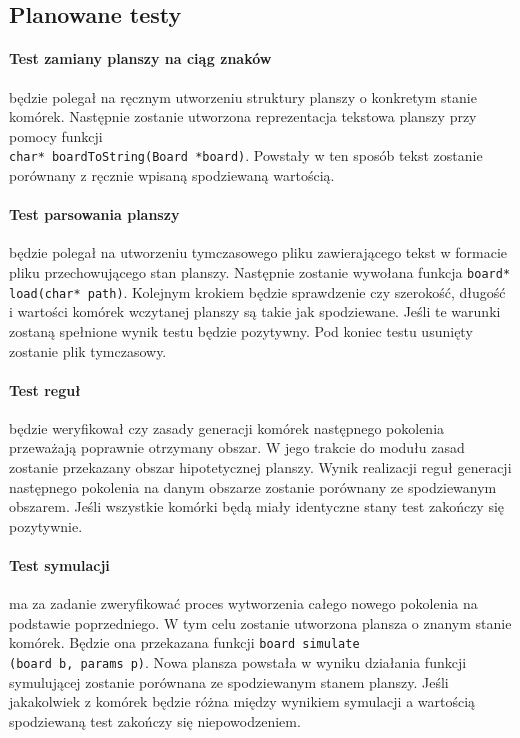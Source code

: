\documentclass{article}
\begin{document}
\subsection{Planowane testy}

\paragraph{Test zamiany planszy na ciąg znaków} będzie polegał na ręcznym utworzeniu struktury planszy o konkretym stanie komórek. Następnie zostanie utworzona reprezentacja tekstowa planszy przy pomocy funkcji \\ \texttt{char* boardToString(Board *board)}. Powstały w ten sposób tekst zostanie porównany z ręcznie wpisaną spodziewaną wartością.

\paragraph{Test parsowania planszy} będzie polegał na utworzeniu tymczasowego pliku zawierającego tekst w formacie pliku przechowującego stan planszy. Następnie zostanie wywołana funkcja \texttt{board* load(char* path)}. Kolejnym krokiem będzie sprawdzenie czy szerokość, długość i wartości komórek wczytanej planszy są takie jak spodziewane. Jeśli te warunki zostaną spełnione wynik testu będzie pozytywny. Pod koniec testu usunięty zostanie plik tymczasowy.

\paragraph{Test reguł} będzie weryfikował czy zasady generacji komórek następnego pokolenia przeważają poprawnie otrzymany obszar. W jego trakcie do modułu zasad zostanie przekazany obszar hipotetycznej planszy. Wynik realizacji reguł generacji następnego pokolenia na danym obszarze zostanie porównany ze spodziewanym obszarem. Jeśli wszystkie komórki będą miały identyczne stany test zakończy się pozytywnie.

\paragraph{Test symulacji} ma za zadanie zweryfikować proces wytworzenia całego nowego pokolenia na podstawie poprzedniego. W tym celu zostanie utworzona plansza o znanym stanie komórek. Będzie ona przekazana funkcji \texttt{board simulate\\(board b, params p)}. Nowa plansza powstała w wyniku działania funkcji symulującej zostanie porównana ze spodziewanym stanem planszy. Jeśli jakakolwiek z komórek będzie różna między wynikiem symulacji a wartością spodziewaną test zakończy się niepowodzeniem.
\end{document}
